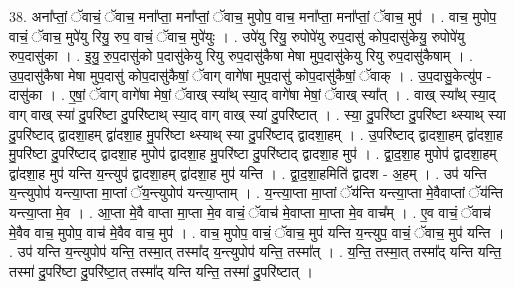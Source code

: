\documentclass[17pt]{extarticle}
\begin{document}
38. अना᳚प्तां॒ ॅवाचं॒ ॅवाच॒ मना᳚प्ता॒ मना᳚प्तां॒ ॅवाच॒ मुपोप॒ वाच॒ मना᳚प्ता॒ मना᳚प्तां॒ ॅवाच॒ मुप॑ । . वाच॒ मुपोप॒ वाचं॒ ॅवाच॒ मुपे॑यु रियु॒ रुप॒ वाचं॒ ॅवाच॒ मुपे॑युः । . उपे॑यु रियु॒ रुपोपे॑यु रुप॒दासु॑ कोप॒दासु॑केयु॒ रुपोपे॑यु रुप॒दासु॑का । . इ॒यु॒ रु॒प॒दासु॑को प॒दासु॑केयु रियु रुप॒दासु॑कैषा मेषा मुप॒दासु॑केयु रियु रुप॒दासु॑कैषाम् । . उ॒प॒दासु॑कैषा मेषा मुप॒दासु॑ कोप॒दासु॑कैषां॒ ॅवाग् वागे॑षा मुप॒दासु॑ कोप॒दासु॑कैषां॒ ॅवाक् । . उ॒प॒दासु॒केत्यु॑प - दासु॑का । . ए॒षां॒ ॅवाग् वागे॑षा मेषां॒ ॅवाख् स्या᳚थ् स्या॒द् वागे॑षा मेषां॒ ॅवाख् स्या᳚त् । . वाख् स्या᳚थ् स्या॒द् वाग् वाख् स्या॑ दु॒परि॑ष्टा दु॒परि॑ष्टाथ् स्या॒द् वाग् वाख् स्या॑ दु॒परि॑ष्टात् । . स्या॒ दु॒परि॑ष्टा दु॒परि॑ष्टा थ्स्याथ् स्या दु॒परि॑ष्टाद् द्वादशा॒हम् द्वा॑दशा॒ह मु॒परि॑ष्टा थ्स्याथ् स्या दु॒परि॑ष्टाद् द्वादशा॒हम् । . उ॒परि॑ष्टाद् द्वादशा॒हम् द्वा॑दशा॒ह मु॒परि॑ष्टा दु॒परि॑ष्टाद् द्वादशा॒ह मुपोप॑ द्वादशा॒ह मु॒परि॑ष्टा दु॒परि॑ष्टाद् द्वादशा॒ह मुप॑ । . द्वा॒द॒शा॒ह मुपोप॑ द्वादशा॒हम् द्वा॑दशा॒ह मुप॑ यन्ति य॒न्त्युप॑ द्वादशा॒हम् द्वा॑दशा॒ह मुप॑ यन्ति । . द्वा॒द॒शा॒हमिति॑ द्वादश - अ॒हम् । . उप॑ यन्ति य॒न्त्युपोप॑ यन्त्या॒प्ता मा॒प्तां ॅय॒न्त्युपोप॑ यन्त्या॒प्ताम् । . य॒न्त्या॒प्ता मा॒प्तां ॅय॑न्ति यन्त्या॒प्ता मे॒वैवाप्तां ॅय॑न्ति यन्त्या॒प्ता मे॒व । . आ॒प्ता मे॒वै वाप्ता मा॒प्ता मे॒व वाचं॒ ॅवाच॑ मे॒वाप्ता मा॒प्ता मे॒व वाच᳚म् । . ए॒व वाचं॒ ॅवाच॑ मे॒वैव वाच॒ मुपोप॒ वाच॑ मे॒वैव वाच॒ मुप॑ । . वाच॒ मुपोप॒ वाचं॒ ॅवाच॒ मुप॑ यन्ति य॒न्त्युप॒ वाचं॒ ॅवाच॒ मुप॑ यन्ति । . उप॑ यन्ति य॒न्त्युपोप॑ यन्ति॒ तस्मा॒त् तस्मा᳚द् य॒न्त्युपोप॑ यन्ति॒ तस्मा᳚त् । . य॒न्ति॒ तस्मा॒त् तस्मा᳚द् यन्ति यन्ति॒ तस्मा॑ दु॒परि॑ष्टा दु॒परि॑ष्टा॒त् तस्मा᳚द् यन्ति यन्ति॒ तस्मा॑ दु॒परि॑ष्टात् । \newline
\end{document}
